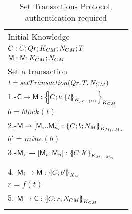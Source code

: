 \begin{table}[htb]
\footnotesize
\begin{center}
\caption{Set Transactions Protocol, authentication required}
\label{table:ProtSetTrans}
\begin{tabular}{|l|}
\hline
           Initial Knowledge                                                             \\
            $C:C; Qr ;  K_{CM} ; N_{CM} ; T$               \\
            $\textsf{M}: \textsf{M}; K_{CM} ; N_{CM}$    \\ \hline \hline 
           Set a transaction                                                                        \\
           \hspace{5mm} $t=setTransaction(Qr,T,N_{CM})$                                  \\  
           1.-$\Client\rightarrow \Server: \fat{C \lnk t \lnk \fat{t}_{K_{priv(C)}}}_{K_{\client\serverW}}$          \\ 
           \hspace{5mm} $b=block(t)$                                  \\  
           2.-$\Server\rightarrow [\Server_i .. \Server_n]: \fat{C \lnk b \lnk N_\serverW}_{K_{\serverW_i .. \serverW_n}}$          \\ 
           \hspace{5mm} $b'=mine(b)$                                  \\  
           3.-$\Server_x\rightarrow [\Server_i .. \Server_n]: \fat{C \lnk b'}_{K_{\serverW_i .. \serverW_n}}$          \\            
                                             \\  
           4.-$\Server_i\rightarrow \Server: \fat{C \lnk b'}_{K_{\serverW}}$          \\            
           \hspace{5mm} $r=f(t)$                                  \\  
           5.-$\Server\rightarrow \Client: \fat{C \lnk r \lnk N_{\client\serverW}}_{K_{\client\serverW}}$       \\\\  \hline \hline
\end{tabular}
\end{center}
\end{table}
\normalsize
